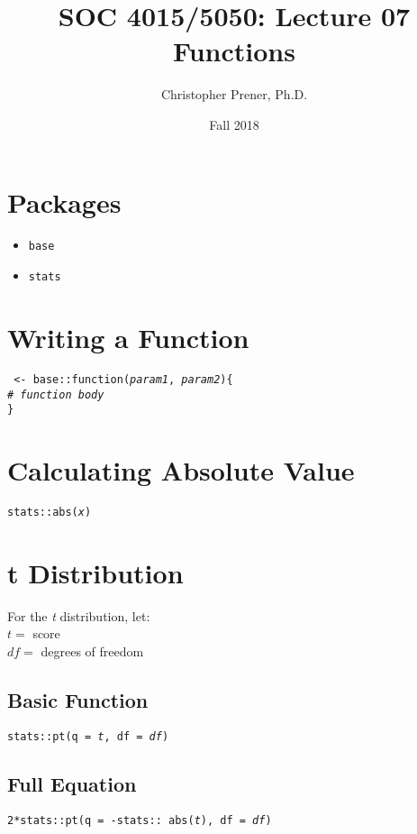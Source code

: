 \documentclass{tufte-handout}
\title{SOC 4015/5050: Lecture 07 Functions}
\author{Christopher Prener, Ph.D.}
\date{Fall 2018}
\newenvironment{subs}
  {\adjustwidth{3em}{0pt}}
  {\endadjustwidth}
\begin{document}
\maketitle %

\vspace{5mm}
\section{Packages}
\begin{itemize}
\item \texttt{base}
\item \texttt{stats}
\end{itemize}

\vspace{3mm}
\section{Writing a Function}
\texttt{ <- base::}{\color{red}\texttt{function}}\texttt{(\textit{param1}, \textit{param2})\{}\\
\texttt{\textit{\# function body}}\\
\noindent \texttt{\}}

\vspace{5mm}
\section{Calculating Absolute Value}
\texttt{stats::}{\color{red}\texttt{abs}}\texttt{(\textit{x})}

\vspace{5mm}
\section{t Distribution}
For the \textit{t} distribution, let: \\
\noindent $t =$ score\\
\noindent $df =$ degrees of freedom\\

\begin{subs}

\vspace{3mm}
\subsection{Basic Function}
\noindent \texttt{stats::}{\color{red}\texttt{pt}}\texttt{(q = \textit{t}, df = \textit{df})}\\

\vspace{3mm}
\subsection{Full Equation}
\noindent \texttt{2*stats::}{\color{red}\texttt{pt}}\texttt{(q = -stats::{\color{red} abs}(\textit{t}), df = \textit{df})}

\end{subs}
\end{document}
